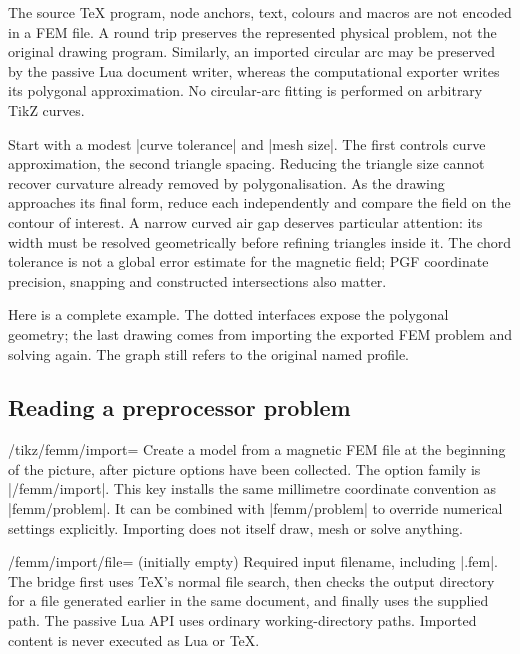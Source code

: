 The source TeX program, node anchors, text, colours and macros are not encoded
in a FEM file. A round trip preserves the represented physical problem, not the
original drawing program. Similarly, an imported circular arc may be preserved
by the passive Lua document writer, whereas the computational exporter writes
its polygonal approximation. No circular-arc fitting is performed on arbitrary
TikZ curves.

Start with a modest |curve tolerance| and |mesh size|. The first controls curve
approximation, the second triangle spacing. Reducing the triangle size cannot
recover curvature already removed by polygonalisation. As the drawing approaches
its final form, reduce each independently and compare the field on the contour
of interest. A narrow curved air gap deserves particular attention: its width
must be resolved geometrically before refining triangles inside it.
The chord tolerance is not a global error estimate for the magnetic field;
PGF coordinate precision, snapping and constructed intersections also matter.

Here is a complete example. The dotted interfaces expose the polygonal geometry;
the last drawing comes from importing the exported FEM problem and solving again.
The graph still refers to the original named profile.

\subsection{Reading a preprocessor problem}

\begin{key}{/tikz/femm/import=}
Create a model from a magnetic FEM file at the beginning of the picture, after
picture options have been collected. The option family is |/femm/import|.
This key installs the same millimetre coordinate convention as |femm/problem|.
It can be combined with |femm/problem| to override numerical settings explicitly.
Importing does not itself draw, mesh or solve anything.
\end{key}
\begin{key}{/femm/import/file= (initially empty)}
Required input filename, including |.fem|. The bridge first uses TeX's normal
file search, then checks the output directory for a file generated earlier in
the same document, and finally uses the supplied path. The passive Lua API uses
ordinary working-directory paths. Imported content is never executed as Lua or TeX.
\end{key}

